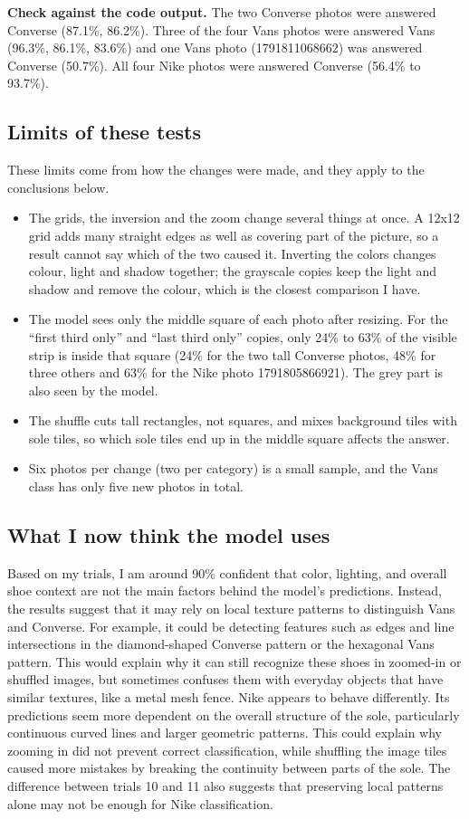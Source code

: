 \documentclass[11pt]{article}
\begin{document}
\textbf{Check against the code output.} The two Converse photos were answered Converse (87.1\%, 86.2\%). Three of the four Vans photos were answered Vans (96.3\%, 86.1\%, 83.6\%) and one Vans photo (1791811068662) was answered Converse (50.7\%). All four Nike photos were answered Converse (56.4\% to 93.7\%).

\subsection*{Limits of these tests}
These limits come from how the changes were made, and they apply to the conclusions below.
\begin{itemize}
  \item The grids, the inversion and the zoom change several things at once. A 12x12 grid adds many straight edges as well as covering part of the picture, so a result cannot say which of the two caused it. Inverting the colors changes colour, light and shadow together; the grayscale copies keep the light and shadow and remove the colour, which is the closest comparison I have.
  \item The model sees only the middle square of each photo after resizing. For the ``first third only'' and ``last third only'' copies, only 24\% to 63\% of the visible strip is inside that square (24\% for the two tall Converse photos, 48\% for three others and 63\% for the Nike photo 1791805866921). The grey part is also seen by the model.
  \item The shuffle cuts tall rectangles, not squares, and mixes background tiles with sole tiles, so which sole tiles end up in the middle square affects the answer.
  \item Six photos per change (two per category) is a small sample, and the Vans class has only five new photos in total.
\end{itemize}

\subsection*{What I now think the model uses}
Based on my trials, I am around 90\% confident that color, lighting, and overall shoe context are not the main factors behind the model's predictions. Instead, the results suggest that it may rely on local texture patterns to distinguish Vans and Converse. For example, it could be detecting features such as edges and line intersections in the diamond-shaped Converse pattern or the hexagonal Vans pattern. This would explain why it can still recognize these shoes in zoomed-in or shuffled images, but sometimes confuses them with everyday objects that have similar textures, like a metal mesh fence. Nike appears to behave differently. Its predictions seem more dependent on the overall structure of the sole, particularly continuous curved lines and larger geometric patterns. This could explain why zooming in did not prevent correct classification, while shuffling the image tiles caused more mistakes by breaking the continuity between parts of the sole. The difference between trials 10 and 11 also suggests that preserving local patterns alone may not be enough for Nike classification.
\end{document}
